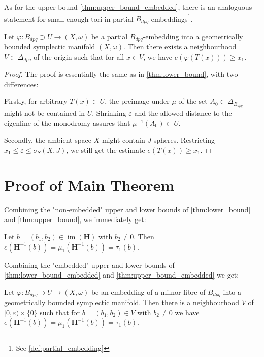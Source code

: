 \documentclass[12pt,a4paper,draft]{scrartcl}
\DeclareMathOperator{\im}{im}
\begin{document}
As for the upper bound \cref{thm:upper_bound_embedded}, there is an analoguous statement for small enough tori in partial $B_{dpq}$-embeddings\footnote{See \cref{def:partial_embedding}}.

\begin{proposition}
  \label{thm:lower_bound_embedded}
    Let $φ:B_{dpq} ⊃ U → (X,ω)$ be a partial $B_{dpq}$-embedding into a geometrically bounded symplectic manifold $(X,\omega)$. Then there exists a neighbourhood $V \subset \Delta_{dpq}$ of the origin such that for all $x \in V$, we have $e(φ(T(x))) \geq x_1$.
\end{proposition}

\begin{proof}


  The proof is essentially the same as in \cref{thm:lower_bound}, with two differences:

  Firstly, for arbitrary $T(x) ⊂ U$, the preimage under $μ$ of the set $A_0 ⊂ Δ_{B_{dpq}}$ might not be contained in $U$.
  Shrinking $ε$ and the allowed distance to the eigenline of the monodromy assures that $μ^{-1}(A_0) ⊂ U$.

  Secondly, the ambient space $X$ might contain $J$-spheres.
Restricting $x_1 ≤ ε ≤ σ_S(X,J)$, we still get the estimate $e(T(x)) ≥ x_1$.

\end{proof}




\section{Proof of Main Theorem}
\label{sec:main_thm}

Combining the "non-embedded" upper and lower bounds of \cref{thm:lower_bound} and \cref{thm:upper_bound}, we immediately get:

\begin{theorem}
  \label{thm:displacement_energy}
  Let $b=(b_1,b_2) ∈ \im(\symbf{H})$ with $b_2 ≠ 0$. Then $e(\symbf{H}^{-1}(b)) = μ_1(\symbf{H}^{-1}(b)) = τ_1(b)$.
\end{theorem}

Combining the "embedded" upper and lower bounds of \cref{thm:lower_bound_embedded} and \cref{thm:upper_bound_embedded} we get:

\begin{theorem}
  \label{thm:displacement_energy_embedded}
  Let $φ \colon B_{dpq} ⊃ U → (X,ω)$ be an embedding of a milnor fibre of $B_{dpq}$ into a geometrically bounded symplectic manifold.
Then there is a neighbourhood $V$ of $[0,ε) × \{0\}$ such that for $b = (b_1,b_2) ∈ V$ with $b_2 ≠ 0$ we have $e(\symbf{H}^{-1}(b)) = μ_1(\symbf{H}^{-1}(b)) = τ_1(b)$.
\end{theorem}
\end{document}
